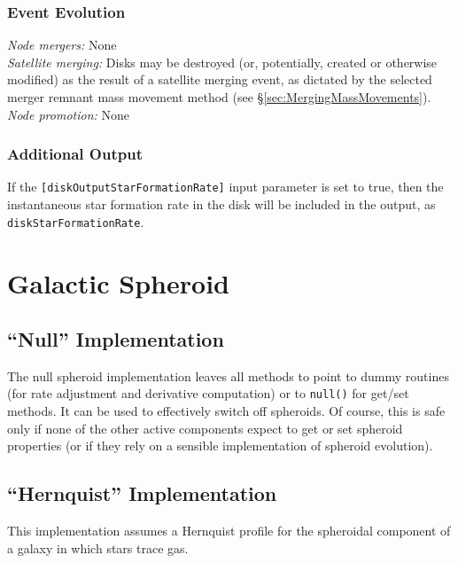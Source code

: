 \subsubsection{Event Evolution}

\noindent\emph{Node mergers:} None\\

\noindent\emph{Satellite merging:} Disks may be destroyed (or, potentially, created or otherwise modified) as the result of a satellite merging event, as dictated by the selected merger remnant mass movement method (see \S\ref{sec:MergingMassMovements}).\\

\noindent\emph{Node promotion:} None\\

\subsubsection{Additional Output}

If the {\tt [diskOutputStarFormationRate]} input parameter is set to true, then the instantaneous star formation rate in the disk will be included in the output, as {\tt diskStarFormationRate}.

\section{Galactic Spheroid}

\subsection{``Null'' Implementation}

The null spheroid implementation leaves all methods to point to dummy routines (for rate adjustment and derivative computation) or to {\tt null()} for get/set methods. It can be used to effectively switch off spheroids. Of course, this is safe only if none of the other active components expect to get or set spheroid properties (or if they rely on a sensible implementation of spheroid evolution).

\subsection{``Hernquist'' Implementation}

This implementation assumes a Hernquist profile \citep{hernquist_analytical_1990} for the spheroidal component of a galaxy in which stars trace gas.

